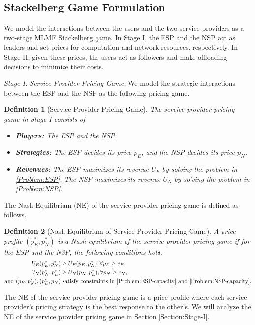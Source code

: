 \documentclass[lettersize,journal]{IEEEtran}
\newtheorem{definition}{Definition}
\begin{document}
\subsection{Stackelberg Game Formulation}\label{sec_game_formulation}
We model the interactions between the users and the two service providers as a two-stage MLMF Stackelberg game. In Stage I, the ESP and the NSP act as leaders and set prices for computation and network resources, respectively. In Stage II, given these prices, the users act as followers and make offloading decisions to minimize their costs.

\emph{Stage I: Service Provider Pricing Game.} 
We model the strategic interactions between the ESP and the NSP as the following pricing game.
\begin{definition}[Service Provider Pricing Game]
The service provider pricing game in Stage I consists of
\begin{itemize}
    \item \textbf{Players:} The ESP and the NSP.
    \item \textbf{Strategies:} The ESP decides its price $p_E$, and the NSP decides its price $p_N$.
    \item \textbf{Revenues:} The ESP maximizes its revenue $U_E$ by solving the problem in \eqref{Problem:ESP}. The NSP maximizes its revenue $U_N$ by solving the problem in \eqref{Problem:NSP}.
\end{itemize}
\end{definition}

The Nash Equilibrium (NE) of the service provider pricing game is defined as follows.
\begin{definition}[Nash Equilibrium of Service Provider Pricing Game]\label{def:sp-ne}
A price profile $(p_E^*,p_N^*)$ is a Nash equilibrium of the service provider pricing game if for the ESP and the NSP, the following conditions hold,
\begin{align}
    U_E(p_E^*,p_N^*)&\ge U_E(p_E,p_N^*),\forall p_E\ge c_E,\\
    U_N(p_N^*,p_E^*)&\ge U_N(p_N,p_E^*),\forall p_N\ge c_N,\\
    \text{and } (p_E,p_N^*),(p_E^*,p_N)&\text{ satisfy constraints in \eqref{Problem:ESP-capacity} and \eqref{Problem:NSP-capacity}.}\nonumber
\end{align}
\end{definition}
The NE of the service provider pricing game is a price profile where each service provider's pricing strategy is the best response to the other's. We will analyze the NE of the service provider pricing game in Section \ref{Section:Stage-I}.
\end{document}
